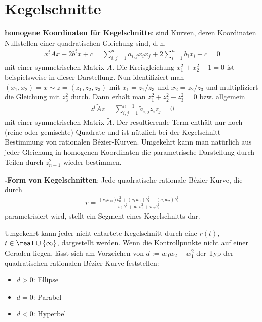 \pagebreak

\section{%
    Kegelschnitte%
}

\textbf{homogene Koordinaten für Kegelschnitte}:
 sind Kurven, deren Koordinaten Nullstellen einer quadratischen Gleichung
sind, d.\,h.
\begin{align*}
    x^t A x + 2 b^t x + c = \sum_{i,j=1}^n a_{i,j} x_i x_j + 2 \sum_{i=1}^n b_i x_i + c = 0
\end{align*}
mit einer symmetrischen Matrix $A$.
Die Kreisgleichung $x_1^2 + x_2^2 - 1 = 0$ ist beispielsweise in dieser Darstellung.
Nun identifiziert man $(x_1, x_2) = x \sim z = (z_1, z_2, z_3)$ mit
$x_1 = z_1/z_3$ und $x_2 = z_2/z_3$ und multipliziert die Gleichung mit $z_3^2$ durch.
Dann erhält man $z_1^2 + z_2^2 - z_3^2 = 0$ bzw. allgemein
\begin{align*}
    z^t \widetilde{A} z = \sum_{i,j=1}^{n+1} \widetilde{a}_{i,j} z_i z_j = 0
\end{align*}
mit einer symmetrischen Matrix $\widetilde{A}$.
Der resultierende Term enthält nur noch (reine oder gemischte) Quadrate
und ist nützlich bei der Kegelschnitt-Bestimmung von rationalen Bézier-Kurven.
Umgekehrt kann man natürlich aus jeder Gleichung in homogenen Koordinaten die parametrische
Darstellung durch Teilen durch $z_{n+1}^2$ wieder bestimmen.

\linie

\textbf{-Form von Kegelschnitten}:
Jede quadratische rationale Bézier-Kurve, die durch
\begin{align*}
    r = \frac{(c_0 w_0) b_0^2 + (c_1 w_1) b_1^2 + (c_2 w_2) b_2^2}
    {w_0 b_0^2 + w_1 b_1^2 + w_2 b_2^2}
\end{align*}
parametrisiert wird, stellt ein Segment eines Kegelschnitts dar.

Umgekehrt kann jeder nicht-entartete Kegelschnitt durch eine 
$r(t)$, $t \in \real \cup \{\infty\}$, dargestellt werden.
Wenn die Kontrollpunkte nicht auf einer Geraden liegen, lässt sich am Vorzeichen von
$d := w_0 w_2 - w_1^2$ der Typ der quadratischen rationalen Bézier-Kurve feststellen:
\begin{itemize}
    \item
    $d > 0$: Ellipse

    \item
    $d = 0$: Parabel

    \item
    $d < 0$: Hyperbel
\end{itemize}

